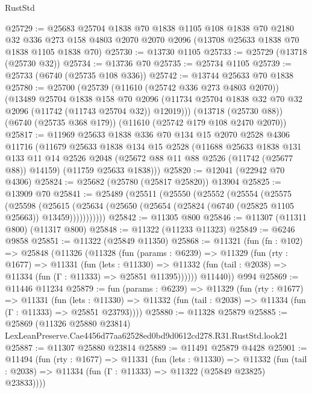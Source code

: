 \begin{lexlean}{RustStd}
\begin{coremodule}
@25729 := @25683
    @25704
    @1838
    @70
    @1838
    @1105
    @108
    @1838
    @70
    @2180
    @32
    @336
    @273
    @158
    @4803
    @2070
    @2070
    @2096
    (@13708 @25633 @1838 @70 @1838 @1105 @1838 @70)
@25730 := @13730 @1105
@25733 := @25729 (@13718 (@25730 @32))
@25734 := @13736 @70
@25735 := @25734 @1105
@25739 := @25733 (@6740 (@25735 @108 @336))
@25742 := @13744 @25633 @70 @1838
@25780 := @25700
    (@25739
      (@11610 (@25742 @336 @273 @4803 @2070))
      (@13489
        @25704
        @1838
        @158
        @70
        @2096
        (@11734 @25704 @1838 @32 @70 @32 @2096 (@11742 (@11743 @25704 @32)) @12019)))
    (@13718 (@25730 @88))
    (@6740 (@25735 @368 @179))
    (@11610 (@25742 @179 @108 @2470 @2070))
@25817 := @11969
    @25633
    @1838
    @336
    @70
    @134
    @15
    @2070
    @2528
    @4306
    @11716
    (@11679
      @25633
      @1838
      @134
      @15
      @2528
      (@11688
        @25633
        @1838
        @131
        @133
        @11
        @14
        @2526
        @2048
        (@25672 @88 @11 @88 @2526 (@11742 (@25677 @88)) @14159)
        (@11759 @25633 @1838)))
@25820 := @12041 (@22942 @70 @4306)
@25824 := @25682 (@25780 (@25817 @25820)) @13904
@25825 := @13909 @70
@25841 := @25489
    (@25511
      (@25550
        (@25552
          (@25554
            (@25575
              (@25598
                (@25615
                  (@25634 (@25650 (@25654 (@25824 (@6740 (@25825 @1105 @25663)) @13459)))))))))))
@25842 := @11305 @800
@25846 := @11307 (@11311 @800) (@11317 @800)
@25848 := @11322 (@11233 @11323)
@25849 := @6246 @9858
@25851 := @11322 (@25849 @11350)
@25868 := @11321
    (fun (fn : @102) =>
    @25848
      (@11326
        (@11328
          (fun (params : @6239) =>
          @11329
            (fun (rty : @1677) =>
            @11331
              (fun (lets : @11330) =>
              @11332 (fun (tail : @2038) => @11334 (fun (Γ : @11333) => @25851 @11395))))))
        @11440))
    @994
@25869 := @11446 @11234
@25879 := fun (params : @6239) =>
  @11329
    (fun (rty : @1677) =>
    @11331
      (fun (lets : @11330) =>
      @11332 (fun (tail : @2038) => @11334 (fun (Γ : @11333) => @25851 @23793))))
@25880 := @11328 @25879
@25885 := @25869
    (@11326 @25880 @23814)
    LexLeanPreserve.Cae4456d77aa62528ed0bd9d0612cd278.R31.RustStd.look21
@25887 := @11307 @25880 @23814
@25889 := @11491 @25879 @4428
@25901 := @11494
    (fun (rty : @1677) =>
    @11331
      (fun (lets : @11330) =>
      @11332 (fun (tail : @2038) => @11334 (fun (Γ : @11333) => @11322 (@25849 @23825) @23833))))

\end{coremodule}
\end{lexlean}
